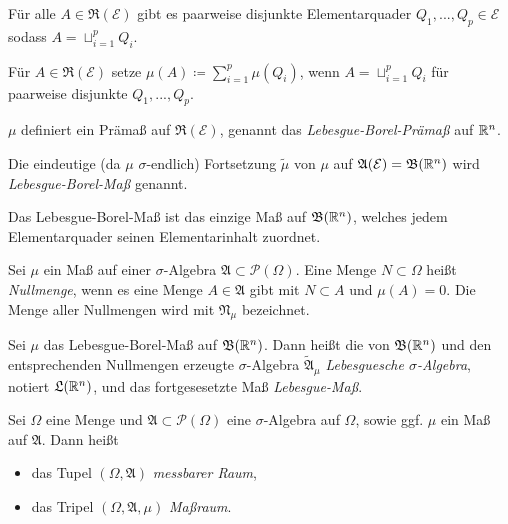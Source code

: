 \documentclass{cheat-sheet}
\newcommand{\PS}{\mathcal{P}} %
\newcommand{\PSO}{\PS(\Omega)} %
\newcommand{\Alg}{\mathfrak{A}}
\newcommand{\Ring}{\mathfrak{R}}
\newcommand{\Bor}{\mathfrak{B}} %
\begin{document}
\begin{satz}
  Für alle $A \in \Ring(\mathcal{E})$ gibt es paarweise disjunkte Elementarquader $Q_1, ..., Q_p \in \mathcal{E}$ sodass $A = \sqcup_{i = 1}^p Q_i$.
\end{satz}

\begin{defn}
  Für $A \in \Ring(\mathcal{E})$ setze $\mu(A) \coloneqq \textstyle\sum_{i = 1}^p \mu(Q_i)$, wenn $A = \sqcup_{i = 1}^p Q_i$ für paarweise disjunkte $Q_1, ..., Q_p$.
\end{defn}

\begin{satz}
  $\mu$ definiert ein Prämaß auf $\Ring(\mathcal{E})$, genannt das \emph{Lebesgue-Borel-Prämaß} auf $\mathbb{R}^n$.
\end{satz}

\begin{defn}
  Die eindeutige (da $\mu$ $\sigma$-endlich) Fortsetzung $\tilde{\mu}$ von $\mu$ auf $\Alg(\mathcal{E}) = \Bor(\R^n)$ wird \emph{Lebesgue-Borel-Maß} genannt.
\end{defn}

\begin{bem}
  Das Lebesgue-Borel-Maß ist das einzige Maß auf $\Bor(\R^n)$, welches jedem Elementarquader seinen Elementarinhalt zuordnet.
\end{bem}

\begin{defn}
  Sei $\mu$ ein Maß auf einer $\sigma$-Algebra $\Alg \subset \PSO$. Eine Menge $N \subset \Omega$ heißt \emph{Nullmenge}, wenn es eine Menge $A \in \Alg$ gibt mit $N \subset A$ und $\mu(A) = 0$. Die Menge aller Nullmengen wird mit $\mathfrak{N}_\mu$ bezeichnet.
\end{defn}

\begin{defn}
  Sei $\mu$ das Lebesgue-Borel-Maß auf $\Bor(\R^n)$. Dann heißt die von $\Bor(\R^n)$ und den entsprechenden Nullmengen erzeugte $\sigma$-Algebra $\tilde{\Alg}_\mu$ \emph{Lebesguesche $\sigma$-Algebra}, notiert $\mathfrak{L}(\mathbb{R}^n)$, und das fortgesesetzte Maß \emph{Lebesgue-Maß}.
\end{defn}

\begin{defn}
  Sei $\Omega$ eine Menge und $\Alg \subset \PSO$ eine $\sigma$-Algebra auf $\Omega$, sowie ggf. $\mu$ ein Maß auf $\Alg$. Dann heißt
  \begin{itemize}
    \item das Tupel $(\Omega, \Alg)$ \emph{messbarer Raum},
    \item das Tripel $(\Omega, \Alg, \mu)$ \emph{Maßraum}.
  \end{itemize}
\end{defn}
\end{document}
